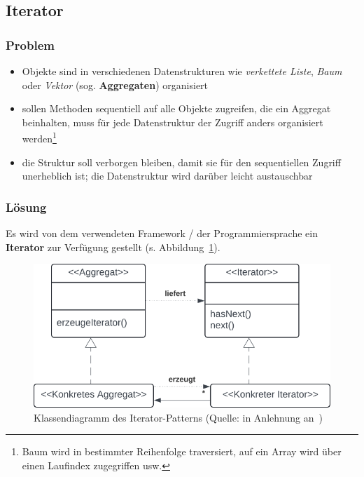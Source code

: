 \subsection{Iterator}

\subsubsection*{Problem}
\begin{itemize}
    \item Objekte sind in verschiedenen Datenstrukturen wie \textit{verkettete Liste}, \textit{Baum} oder \textit{Vektor} (sog. \textbf{Aggregaten}) organisiert
    \item sollen Methoden sequentiell auf alle Objekte zugreifen, die ein Aggregat beinhalten, muss für jede Datenstruktur der Zugriff anders organisiert werden\footnote{
    Baum wird in bestimmter Reihenfolge traversiert, auf ein Array wird über einen Laufindex zugegriffen usw.
    }
    \item die Struktur soll verborgen bleiben, damit sie für den sequentiellen Zugriff unerheblich ist; die Datenstruktur wird darüber leicht austauschbar
\end{itemize}

\subsubsection*{Lösung}
Es wird von dem verwendeten Framework / der Programmiersprache ein \textbf{Iterator} zur Verfügung gestellt (s. Abbildung~\ref{fig:iterator}).


\begin{figure}
    \centering
    \includegraphics[scale=0.4]{part two/Objektorientierter Entwurf/img/iterator}
    \caption{Klassendiagramm des Iterator-Patterns (Quelle: in Anlehnung an~\cite[60, Abb. 3.9]{Wed09b})}
    \label{fig:iterator}
\end{figure}


